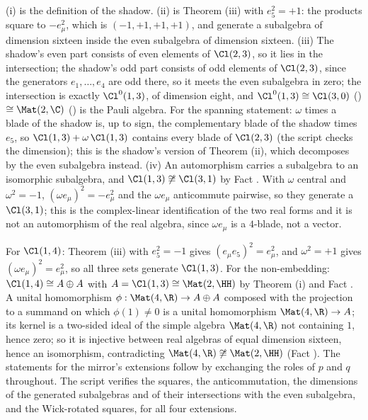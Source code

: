 (i) is the definition of the shadow. (ii) is Theorem (iii) with $e_{5}^{2} = +1$: the products square to $-e_{\mu}^{2}$, which is $(-1, +1, +1, +1)$, and generate a subalgebra of dimension sixteen inside the even subalgebra of dimension sixteen. (iii) The shadow's even part consists of even elements of $\Cl(2,3)$, so it lies in the intersection; the shadow's odd part consists of odd elements of $\Cl(2,3)$, since the generators $e_{1}, \ldots, e_{4}$ are odd there, so it meets the even subalgebra in zero; the intersection is exactly $\Cl^{0}(1,3)$, of dimension eight, and $\Cl^{0}(1,3) \cong \Cl(3,0)$ () $\cong \Mat(2,\C)$ () is the Pauli algebra. For the spanning statement: $\omega$ times a blade of the shadow is, up to sign, the complementary blade of the shadow times $e_{5}$, so $\Cl(1,3) + \omega\,\Cl(1,3)$ contains every blade of $\Cl(2,3)$ (the script checks the dimension); this is the shadow's version of Theorem (ii), which decomposes by the even subalgebra instead. (iv) An automorphism carries a subalgebra to an isomorphic subalgebra, and $\Cl(1,3) \not\cong \Cl(3,1)$ by Fact . With $\omega$ central and $\omega^{2} = -1$, $(\omega e_{\mu})^{2} = -e_{\mu}^{2}$ and the $\omega e_{\mu}$ anticommute pairwise, so they generate a $\Cl(3,1)$; this is the complex-linear identification of the two real forms and it is not an automorphism of the real algebra, since $\omega e_{\mu}$ is a $4$-blade, not a vector.

For $\Cl(1,4)$: Theorem (iii) with $e_{5}^{2} = -1$ gives $(e_{\mu}e_{5})^{2} = e_{\mu}^{2}$, and $\omega^{2} = +1$ gives $(\omega e_{\mu})^{2} = e_{\mu}^{2}$, so all three sets generate $\Cl(1,3)$. For the non-embedding: $\Cl(1,4) \cong A \oplus A$ with $A = \Cl(1,3) \cong \Mat(2,\HH)$ by Theorem (i) and Fact . A unital homomorphism $\phi: \Mat(4,\R) \to A \oplus A$ composed with the projection to a summand on which $\phi(1) \neq 0$ is a unital homomorphism $\Mat(4,\R) \to A$; its kernel is a two-sided ideal of the simple algebra $\Mat(4,\R)$ not containing $1$, hence zero; so it is injective between real algebras of equal dimension sixteen, hence an isomorphism, contradicting $\Mat(4,\R) \not\cong \Mat(2,\HH)$ (Fact ). The statements for the mirror's extensions follow by exchanging the roles of $p$ and $q$ throughout. The script verifies the squares, the anticommutation, the dimensions of the generated subalgebras and of their intersections with the even subalgebra, and the Wick-rotated squares, for all four extensions.
